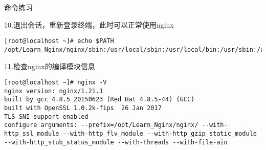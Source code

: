 \begin{ascolorbox10}{命令练习}
	\begin{ascboxJ}{10.退出会话，重新登录终端，此时可以正常使用nginx}
	\begin{lstlisting}[style=linux]
[root@localhost ~]# echo $PATH
/opt/Learn_Nginx/nginx/sbin:/usr/local/sbin:/usr/local/bin:/usr/sbin:/usr/bin:/root/.local/bin:/root/bin
	\end{lstlisting}
\end{ascboxJ}

	\begin{ascboxJ}{11.检查nginx的编译模块信息}
	\begin{lstlisting}[style=linux]
[root@localhost ~]# nginx -V
nginx version: nginx/1.21.1
built by gcc 4.8.5 20150623 (Red Hat 4.8.5-44) (GCC)
built with OpenSSL 1.0.2k-fips  26 Jan 2017
TLS SNI support enabled
configure arguments: --prefix=/opt/Learn_Nginx/nginx/ --with-http_ssl_module --with-http_flv_module --with-http_gzip_static_module --with-http_stub_status_module --with-threads --with-file-aio
	\end{lstlisting}
\end{ascboxJ}	
\end{ascolorbox10}




